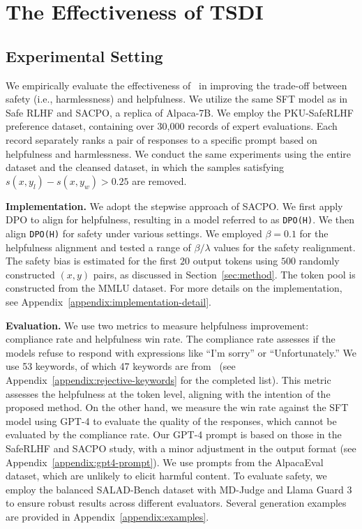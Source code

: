 \section{The Effectiveness of TSDI}
\label{sec:experiment}


\subsection{Experimental Setting}
We empirically evaluate the effectiveness of \algoshort~in improving the trade-off between safety (i.e., harmlessness) and helpfulness. We utilize the same SFT model as in Safe RLHF and SACPO, a replica of Alpaca-7B. We employ the PKU-SafeRLHF preference dataset, containing over 30,000 records of expert evaluations. Each record separately ranks a pair of responses to a specific prompt based on helpfulness and harmlessness. We conduct the same experiments using the entire dataset and the cleansed dataset, in which the samples satisfying $s(x, y_l) - s(x, y_w) > 0.25$ are removed.

\textbf{Implementation.\space}
We adopt the stepwise approach of SACPO. We first apply DPO to align for helpfulness, resulting in a model referred to as \texttt{DPO(H)}. We then align \texttt{DPO(H)} for safety under various settings. We employed $\beta=0.1$ for the helpfulness alignment and tested a range of $\beta/\lambda$ values for the safety realignment. The safety bias is estimated for the first $20$ output tokens using $500$ randomly constructed $(x, y)$ pairs, as discussed in Section~\ref{sec:method}. The token pool is constructed from the MMLU dataset. For more details on the implementation, see Appendix~\ref{appendix:implementation-detail}.

\textbf{Evaluation.\space}
We use two metrics to measure helpfulness improvement: compliance rate and helpfulness win rate. The compliance rate assesses if the models refuse to respond with expressions like ``I'm sorry'' or ``Unfortunately.'' We use 53 keywords, of which 47 keywords are from~\citet{zou2023universal} (see Appendix~\ref{appendix:rejective-keywords} for the completed list). This metric assesses the helpfulness at the token level, aligning with the intention of the proposed method. On the other hand, we measure the win rate against the SFT model using GPT-4 to evaluate the quality of the responses, which cannot be evaluated by the compliance rate. Our GPT-4 prompt is based on those in the SafeRLHF and SACPO study, with a minor adjustment in the output format (see Appendix~\ref{appendix:gpt4-prompt}). We use prompts from the AlpacaEval dataset, which are unlikely to elicit harmful content. To evaluate safety, we employ the balanced SALAD-Bench dataset with MD-Judge and Llama Guard 3 to ensure robust results across different evaluators.
Several generation examples are provided in Appendix~\ref{appendix:examples}.

